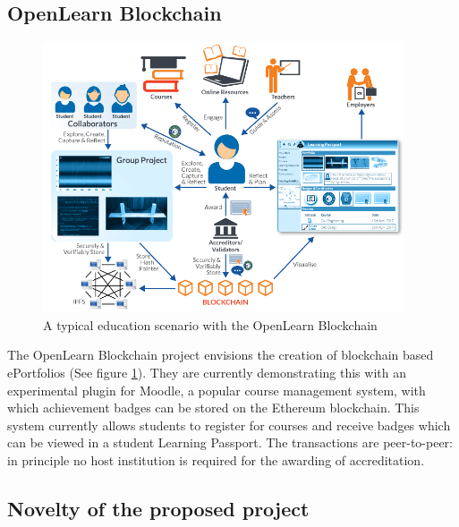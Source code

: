 \subsection{OpenLearn Blockchain}%

\begin{figure}[!h] 
    \centering    
    \includegraphics[width=0.95\textwidth]{openlearn}
    \caption[OpenLearn Blockchain scenario]
        {A typical education scenario with the OpenLearn Blockchain\citep{openlearn2018}}
    \label{fig:openlearn}
\end{figure}

The OpenLearn Blockchain project envisions the creation of blockchain based ePortfolios (See figure 
\ref{fig:openlearn}). They are currently demonstrating this with an experimental plugin for Moodle, 
a popular course management system, with which achievement badges can be stored on the Ethereum 
blockchain. This system currently allows students to register for courses and receive badges which 
can be viewed in a student Learning Passport. The transactions are peer-to-peer: in principle no 
host institution is required for the awarding of accreditation. \citep{sharples2016blockchain}

\subsection{Novelty of the proposed project}

